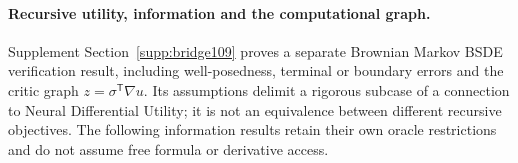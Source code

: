 \documentclass[ecta,nameyear,draft]{econsocart}
\begin{document}






\paragraph{Recursive utility, information and the computational graph.}
Supplement Section~\ref{supp:bridge109} proves a separate Brownian Markov BSDE verification result, including well-posedness, terminal or boundary errors and the critic graph $z=\sigma^{\mathsf T}\nabla u$. Its assumptions delimit a rigorous subcase of a connection to Neural Differential Utility; it is not an equivalence between different recursive objectives. The following information results retain their own oracle restrictions and do not assume free formula or derivative access.











\end{document}
